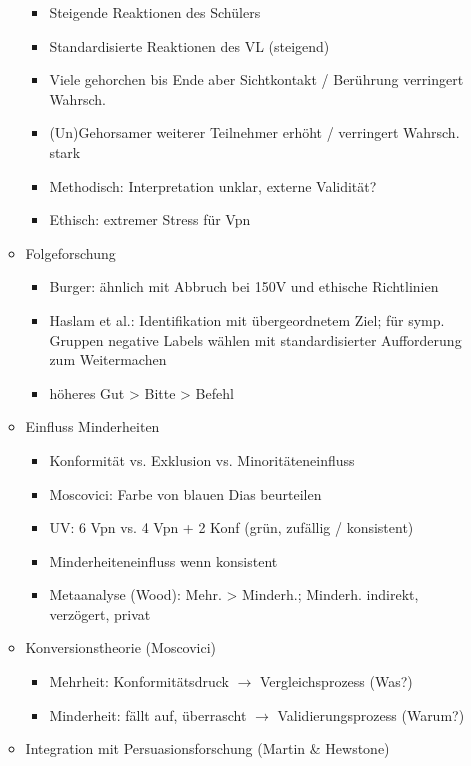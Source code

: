\documentclass[11pt, paper=a4, twocolumn]{scrartcl}
\begin{document}
\begin{itemize}
\begin{itemize}
\begin{itemize}
							\item Steigende Reaktionen des Schülers
							\item Standardisierte Reaktionen des VL (steigend)
							\item Viele gehorchen bis Ende aber Sichtkontakt / Berührung verringert Wahrsch.
							\item (Un)Gehorsamer weiterer Teilnehmer erhöht / verringert Wahrsch. stark
							\item Methodisch: Interpretation unklar, externe Validität?
							\item Ethisch: extremer Stress für Vpn
						\end{itemize}
					\item Folgeforschung
						\begin{itemize}
							\item Burger: ähnlich mit Abbruch bei 150V und ethische Richtlinien
							\item Haslam et al.: Identifikation mit übergeordnetem Ziel; für symp. Gruppen negative Labels 
								wählen mit standardisierter Aufforderung zum Weitermachen
							\item höheres Gut > Bitte > Befehl
						\end{itemize}
					\item Einfluss Minderheiten
						\begin{itemize}
							\item Konformität vs. Exklusion vs. Minoritäteneinfluss
							\item Moscovici: Farbe von blauen Dias beurteilen
							\item UV: 6 Vpn vs. 4 Vpn + 2 Konf (grün, zufällig / konsistent)
							\item Minderheiteneinfluss wenn konsistent
							\item Metaanalyse (Wood): Mehr. > Minderh.; Minderh. indirekt, verzögert, privat
						\end{itemize}
					\item Konversionstheorie (Moscovici)
						\begin{itemize}
							\item Mehrheit: Konformitätsdruck $\rightarrow$ Vergleichsprozess (Was?)
							\item Minderheit: fällt auf, überrascht $\rightarrow$ Validierungsprozess (Warum?)
						\end{itemize}
					\item Integration mit Persuasionsforschung (Martin \& Hewstone)
						\begin{itemize}

\end{itemize}
\end{itemize}
\end{itemize}
\end{document}
